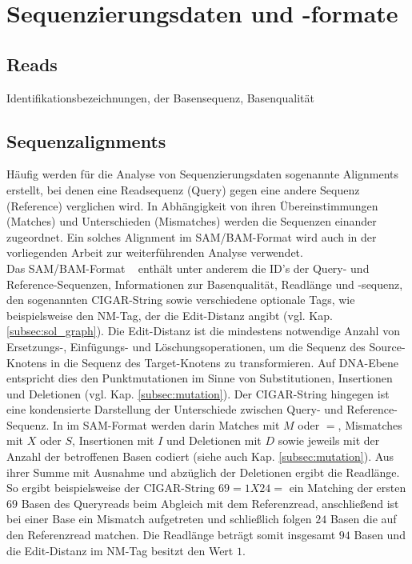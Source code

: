 \section{Sequenzierungsdaten und -formate}
\subsection{Reads} \label{subsec:fastq}
Identifikationsbezeichnungen, der Basensequenz, Basenqualität 

\subsection{Sequenzalignments} \label{subsec:samformat}

Häufig werden für die Analyse von Sequenzierungsdaten sogenannte Alignments erstellt, bei denen eine Readsequenz (Query) gegen eine andere Sequenz (Reference) verglichen wird. In Abhängigkeit von ihren Übereinstimmungen (Matches) und Unterschieden (Mismatches) werden die Sequenzen einander zugeordnet. Ein solches Alignment im SAM/BAM-Format wird auch in der vorliegenden Arbeit zur weiterführenden Analyse verwendet. \\

Das SAM/BAM-Format ~\cite{li_2009} enthält unter anderem die ID's der Query- und Reference-Sequenzen, Informationen zur Basenqualität, Readlänge und -sequenz, den sogenannten CIGAR-String sowie verschiedene optionale Tags, wie beispielsweise den NM-Tag, der die Edit-Distanz angibt (vgl. Kap. \ref{subsec:sol_graph}). Die Edit-Distanz ist die mindestens notwendige Anzahl von Ersetzungs-, Einfügungs- und Löschungsoperationen, um die Sequenz des Source-Knotens in die Sequenz des Target-Knotens zu transformieren. Auf DNA-Ebene entspricht dies den Punktmutationen im Sinne von Substitutionen, Insertionen und Deletionen (vgl. Kap. \ref{subsec:mutation}). Der CIGAR-String hingegen ist eine kondensierte Darstellung der Unterschiede zwischen Query- und Reference-Sequenz. In im SAM-Format werden darin Matches mit $ M $ oder $ = $, Mismatches mit $ X $  oder $ S $,  Insertionen mit $ I $ und Deletionen mit $ D $ sowie jeweils mit der Anzahl der betroffenen Basen codiert (siehe auch Kap. \ref{subsec:mutation}). Aus ihrer Summe mit Ausnahme und abzüglich der Deletionen ergibt die Readlänge. So ergibt beispielsweise der CIGAR-String $ 69=1X24= $ ein Matching der ersten $ 69 $ Basen des Queryreads beim Abgleich mit dem Referenzread, anschließend ist bei einer Base ein Mismatch aufgetreten und schließlich folgen $ 24 $ Basen die auf den Referenzread matchen. Die Readlänge beträgt somit insgesamt $ 94 $ Basen und die Edit-Distanz im NM-Tag besitzt den Wert $ 1 $. \\

